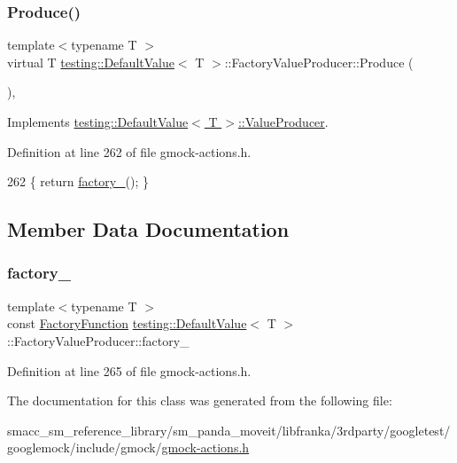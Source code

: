 \subsubsection{\texorpdfstring{Produce()}{Produce()}}
{\footnotesize\ttfamily template$<$typename T $>$ \\
virtual T \hyperlink{classtesting_1_1DefaultValue}{testing\+::\+Default\+Value}$<$ T $>$\+::Factory\+Value\+Producer\+::\+Produce (\begin{DoxyParamCaption}{ }\end{DoxyParamCaption})\hspace{0.3cm}{\ttfamily [inline]}, {\ttfamily [virtual]}}



Implements \hyperlink{classtesting_1_1DefaultValue_1_1ValueProducer_adb9e38abe068ac2e792b53fd32bd7e96}{testing\+::\+Default\+Value$<$ T $>$\+::\+Value\+Producer}.



Definition at line 262 of file gmock-\/actions.\+h.


\begin{DoxyCode}
262 \{ \textcolor{keywordflow}{return} \hyperlink{classtesting_1_1DefaultValue_1_1FactoryValueProducer_ab3a016297d3a8fd3c2849c5a4d202d9b}{factory\_}(); \}
\end{DoxyCode}


\subsection{Member Data Documentation}
\mbox{\label{classtesting_1_1DefaultValue_1_1FactoryValueProducer_ab3a016297d3a8fd3c2849c5a4d202d9b}} 
\subsubsection{\texorpdfstring{factory\+\_\+}{factory\_}}
{\footnotesize\ttfamily template$<$typename T $>$ \\
const \hyperlink{classtesting_1_1DefaultValue_a5763a68d75e0a4c97fcaff708e2df803}{Factory\+Function} \hyperlink{classtesting_1_1DefaultValue}{testing\+::\+Default\+Value}$<$ T $>$\+::Factory\+Value\+Producer\+::factory\+\_\+\hspace{0.3cm}{\ttfamily [private]}}



Definition at line 265 of file gmock-\/actions.\+h.



The documentation for this class was generated from the following file\+:\begin{DoxyCompactItemize}
\item 
smacc\+\_\+sm\+\_\+reference\+\_\+library/sm\+\_\+panda\+\_\+moveit/libfranka/3rdparty/googletest/googlemock/include/gmock/\hyperlink{gmock-actions_8h}{gmock-\/actions.\+h}\end{DoxyCompactItemize}
